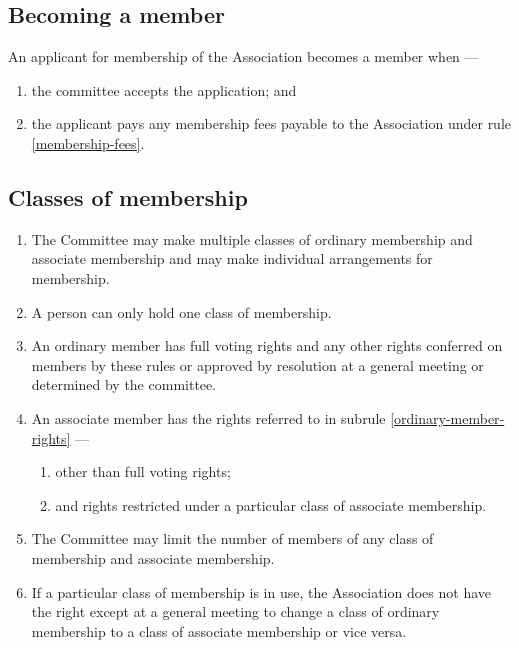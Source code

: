 \documentclass[../constitution.tex]{subfiles}
\begin{document}
\subsection{Becoming a member} \label{becoming-a-member}


An applicant for membership of the Association becomes a member when ---

\begin{enumerate}
  \def\labelenumi{\alph{enumi})}
  \setcounter{enumi}{0}
  \item the committee accepts the application; and
  \item the applicant pays any membership fees payable to the Association under rule \ref{membership-fees}.
\end{enumerate}



\subsection{Classes of membership} \label{classes-of-membership}

\begin{enumerate}
  \item The Committee may make multiple classes of ordinary membership and associate membership and may make individual arrangements for membership.
  \item A person can only hold one class of membership.
  \item An ordinary member has full voting rights and any other rights conferred on members by these rules or approved by resolution at a general meeting or determined by the committee. \label{ordinary-member-rights}
  \item An associate member has the rights referred to in subrule \ref{ordinary-member-rights} --- \label{associate-member-rights}
        \begin{enumerate}
          \item other than full voting rights;
          \item and rights restricted under a particular class of associate membership.
        \end{enumerate}
  \item The Committee may limit the number of members of any class of membership and associate membership.
  \item \label{swap-ordinary-associate-membership} If a particular class of membership is in use, the Association does not have the right except at a general meeting to change a class of ordinary membership to a class of associate membership or vice versa.
\end{enumerate}
\end{document}
